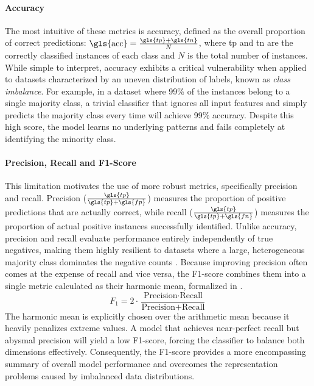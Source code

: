 \paragraph{Accuracy}
The most intuitive of these metrics is accuracy, defined as the overall proportion of correct predictions: $\text{\gls{acc}} = \frac{\gls{tp} + \gls{tn}}{N}$, where \gls{tp} and \gls{tn} are the correctly classified instances of each class and $N$ is the total number of instances. While simple to interpret, accuracy exhibits a critical vulnerability when applied to datasets characterized by an uneven distribution of labels, known as \textit{class imbalance}. For example, in a dataset where 99\% of the instances belong to a single majority class, a trivial classifier that ignores all input features and simply predicts the majority class every time will achieve 99\% accuracy. Despite this high score, the model learns no underlying patterns and fails completely at identifying the minority class.

\paragraph{Precision, Recall and F1-Score}
This limitation motivates the use of more robust metrics, specifically precision and recall. Precision ($\frac{\gls{tp}}{\gls{tp} + \gls{fp}}$) measures the proportion of positive predictions that are actually correct, while recall ($\frac{\gls{tp}}{\gls{tp} + \gls{fn}}$) measures the proportion of actual positive instances successfully identified. Unlike accuracy, precision and recall evaluate performance entirely independently of true negatives, making them highly resilient to datasets where a large, heterogeneous majority class dominates the negative counts \parencite{sokolovaSystematicAnalysisPerformance2009}. Because improving precision often comes at the expense of recall and vice versa, the F1-score combines them into a single metric calculated as their harmonic mean, formalized in .
\begin{equation}
    F_1 = 2 \cdot \frac{\text{Precision} \cdot \text{Recall}}{\text{Precision} + \text{Recall}}
    \label{eq:f1_score}
\end{equation}
The harmonic mean is explicitly chosen over the arithmetic mean because it heavily penalizes extreme values. A model that achieves near-perfect recall but abysmal precision will yield a low F1-score, forcing the classifier to balance both dimensions effectively. Consequently, the F1-score provides a more encompassing summary of overall model performance and overcomes the representation problems caused by imbalanced data distributions.


